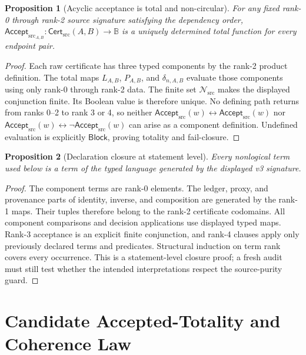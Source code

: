 \documentclass[11pt]{article}
\newtheorem{proposition}{Proposition}
\newcommand{\Cert}{\mathsf{Cert}_{\mathrm{src}}}
\newcommand{\Accept}{\mathsf{Accept}_{\mathrm{src}}}
\newcommand{\Block}{\mathsf{Block}}
\begin{document}
\begin{proposition}[Acyclic acceptance is total and non-circular]
For any fixed rank-0 through rank-2 source signature satisfying the dependency
order, \(\Accept_{A,B}:\Cert(A,B)\to\mathbb B\) is a uniquely determined total
function for every endpoint pair.
\end{proposition}

\begin{proof}
Each raw certificate has three typed components by the rank-2 product
definition. The total maps \(L_{A,B}\), \(P_{A,B}\), and
\(\delta_{n,A,B}\) evaluate those components using only rank-0 through rank-2
data. The finite set \(\mathcal N_{\mathrm{src}}\) makes the displayed
conjunction finite. Its Boolean value is therefore unique. No defining path
returns from ranks 0--2 to rank 3 or 4, so neither \(\Accept(w)\leftrightarrow
\Accept(w)\) nor \(\Accept(w)\leftrightarrow\neg\Accept(w)\) can arise as a
component definition. Undefined evaluation is explicitly \(\Block\), proving
totality and fail-closure.
\end{proof}

\begin{proposition}[Declaration closure at statement level]
Every nonlogical term used below is a term of the typed language generated by
the displayed v3 signature.
\end{proposition}

\begin{proof}
The component terms are rank-0 elements. The ledger, proxy, and provenance
parts of identity, inverse, and composition are generated by the rank-1 maps.
Their tuples therefore belong to the rank-2 certificate codomains. All
component comparisons and decision applications use displayed typed maps.
Rank-3 acceptance is an explicit finite conjunction, and rank-4 clauses apply
only previously declared terms and predicates. Structural induction on term
rank covers every occurrence. This is a statement-level closure proof; a
fresh audit must still test whether the intended interpretations respect the
source-purity guard.
\end{proof}

\section{Candidate Accepted-Totality and Coherence Law}
\end{document}
